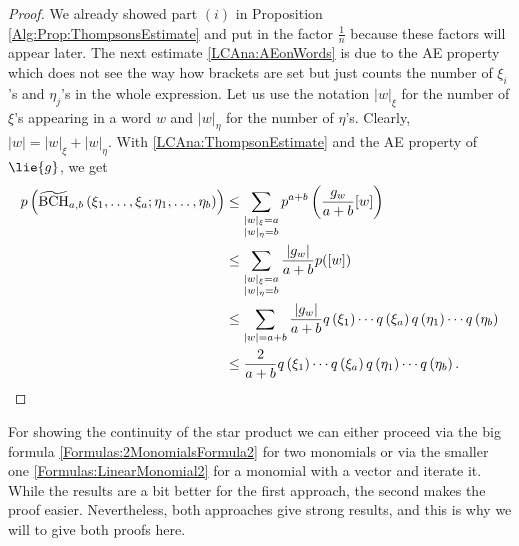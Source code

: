 \begin{proof}
	We already showed part $(i)$ in Proposition 
	\ref{Alg:Prop:ThompsonsEstimate} and put in the factor $\frac{1}{n}$ 
	because these factors will appear later. The next estimate 
	\eqref{LCAna:AEonWords} is due to the AE property which does not see the 
	way how brackets are set but just counts the number of $\xi_i$'s and 
	$\eta_j$'s in the whole expression.
	Let us use the notation $|w|_{\xi}$ for the number of $\xi$'s appearing
	in a word $w$ and $|w|_{\eta}$ for the number of $\eta$'s. Clearly, $|w| =
	|w|_{\xi} + |w|_{\eta}$. With \eqref{LCAna:ThompsonEstimate} and the AE
	property of $\lie{g}$, we get
	\begin{align*}
		p \left(
			\widetilde{\mathrm{BCH}}_{a, b}\left(\xi_1, \ldots, \xi_a; \eta_1, \ldots, \eta_b\right)
		\right)
		& \leq
		\sum\limits_{\substack{
			|w|_{\xi} = a \\
			|w|_{\eta} = b
		}}
		p^{a + b} \left(
			\frac{g_w}{a + b}
			[w]
		\right)
		\\
		& \leq
		\sum\limits_{\substack{
			|w|_{\xi} = a \\
			|w|_{\eta} = b
		}}
		\frac{ |g_w| }{a + b}
		p([w])
		\\
		& \leq
		\sum\limits_{ |w| = a + b }
		\frac{ |g_w| }{a + b}
		q\left( \xi_1 \right) \cdots q\left( \xi_a \right)
		q\left( \eta_1 \right) \cdots q\left( \eta_b \right)
		\\
		& \leq
		\frac{2}{a + b}
		q\left( \xi_1 \right) \cdots q\left( \xi_a \right)
		q\left( \eta_1 \right) \cdots q\left( \eta_b \right).
	\end{align*}
\end{proof}
For showing the continuity of the star product we can either proceed via the 
big formula \eqref{Formulas:2MonomialsFormula2} for two monomials or via the 
smaller one \eqref{Formulas:LinearMonomial2} for a monomial with a vector and 
iterate it. While the results are a bit better for the first approach, the 
second makes the proof easier. Nevertheless, both approaches give strong 
results, and this is why we will to give both proofs here.


